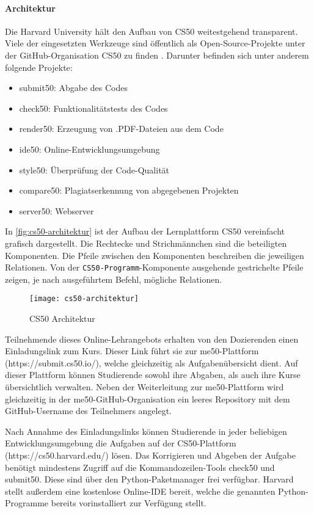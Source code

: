 \newpage

\paragraph{Architektur}
Die Harvard University hält den Aufbau von CS50 weitestgehend transparent.
Viele der eingesetzten Werkzeuge sind öffentlich als Open-Source-Projekte unter
der GitHub-Organisation \glqq CS50\grqq{} zu finden \parencite{cs50-github}.
Darunter befinden sich unter anderem folgende Projekte:
\begin{itemize}
\item submit50: Abgabe des Codes
\item check50: Funktionalitätstests des Codes
\item render50: Erzeugung von .PDF-Dateien aus dem Code
\item ide50: Online-Entwicklungsumgebung
\item style50: Überprüfung der Code-Qualität
\item compare50: Plagiatserkennung von abgegebenen Projekten
\item server50: Webserver
\end{itemize}

In \autoref{fig:cs50-architektur} ist der Aufbau der Lernplattform CS50
vereinfacht grafisch dargestellt. Die Rechtecke und Strichmännchen sind die
beteiligten Komponenten. Die Pfeile zwischen den Komponenten beschreiben die
jeweiligen Relationen. Von der \texttt{CS50-Programm}-Komponente ausgehende
gestrichelte Pfeile zeigen, je nach ausgeführtem Befehl, mögliche Relationen.

\begin{figure}[h]
    \centering
    \texttt{[image: cs50-architektur]}
    \caption{CS50 Architektur}
    \label{fig:cs50-architektur}
\end{figure}

Teilnehmende dieses Online-Lehrangebots erhalten von den Dozierenden einen
Einladungslink zum Kurs. Dieser Link führt sie zur me50-Plattform
(https://submit.cs50.io/), welche gleichzeitig als Aufgabenübersicht dient.
Auf dieser Plattform können Studierende sowohl ihre Abgaben, als auch ihre Kurse
übersichtlich verwalten. Neben der Weiterleitung zur me50-Plattform wird
gleichzeitig in der me50-GitHub-Organisation ein leeres Repository mit dem
GitHub-Username des Teilnehmers angelegt.

Nach Annahme des Einladungslinks können Studierende in jeder beliebigen
Entwicklungsumgebung die Aufgaben auf der CS50-Plattform
(https://cs50.harvard.edu/) lösen. Das Korrigieren und Abgeben der Aufgabe
benötigt mindestens Zugriff auf die Kommandozeilen-Tools check50 und submit50.
Diese sind über den Python-Paketmanager frei verfügbar. Harvard stellt außerdem
eine kostenlose Online-IDE bereit, welche die genannten Python-Programme bereits
vorinstalliert zur Verfügung stellt.

